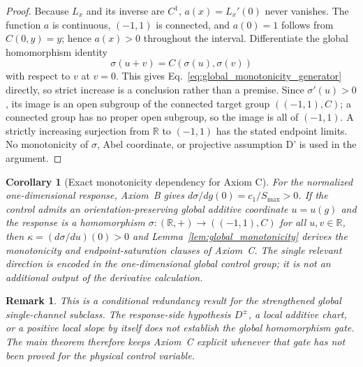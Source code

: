 \documentclass[aps,prd,twocolumn,superscriptaddress,nofootinbib]{revtex4-2}
\newtheorem{corollary}{Corollary}
\newtheorem{remark}{Remark}
\begin{document}
\begin{proof}
Because $L_x$ and its inverse are $C^1$, $a(x)=L_x'(0)$ never vanishes. The function $a$ is continuous, $(-1,1)$ is connected, and $a(0)=1$ follows from $C(0,y)=y$; hence $a(x)>0$ throughout the interval. Differentiate the global homomorphism identity
\[
  \sigma(u+v)=C(\sigma(u),\sigma(v))
\]
with respect to $v$ at $v=0$. This gives Eq.~\eqref{eq:global_monotonicity_generator} directly, so strict increase is a conclusion rather than a premise. Since $\sigma'(u)>0$, its image is an open subgroup of the connected target group $((-1,1),C)$; a connected group has no proper open subgroup, so the image is all of $(-1,1)$. A strictly increasing surjection from $\mathbb{R}$ to $(-1,1)$ has the stated endpoint limits. No monotonicity of $\sigma$, Abel coordinate, or projective assumption D' is used in the argument.
\end{proof}

\begin{corollary}[Exact monotonicity dependency for Axiom C]
\label{cor:monotonicity}
For the normalized one-dimensional response, Axiom~B gives $d\sigma/dg(0)=c_1/S_{\max}>0$. If the control admits an orientation-preserving global additive coordinate $u=u(g)$ and the response is a homomorphism $\sigma:(\mathbb{R},+)\to((-1,1),C)$ for all $u,v\in\mathbb{R}$, then $\kappa=(d\sigma/du)(0)>0$ and Lemma~\ref{lem:global_monotonicity} derives the monotonicity and endpoint-saturation clauses of Axiom~C. The single relevant direction is encoded in the one-dimensional global control group; it is not an additional output of the derivative calculation.
\end{corollary}

\begin{remark}
This is a conditional redundancy result for the strengthened global single-channel subclass. The response-side hypothesis $D^\pm$, a local additive chart, or a positive local slope by itself does not establish the global homomorphism gate. The main theorem therefore keeps Axiom~C explicit whenever that gate has not been proved for the physical control variable.
\end{remark}
\end{document}
